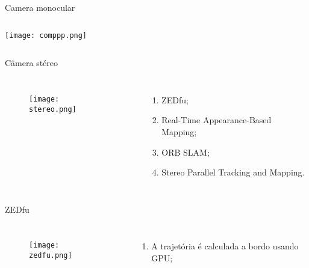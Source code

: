 \begin{frame}[t]{Camera monocular}
    \transboxout[duration=0.5]
    \begin{columns}
            \texttt{[image: comppp.png]}
    \end{columns}
\end{frame}
\begin{frame}[t]{Câmera stéreo}
    \transboxout[duration=0.5]
    \begin{columns}
            \begin{figure}
                \texttt{[image: stereo.png]}
                \caption{\cite{VisualOd23}}
            \end{figure}
            \begin{enumerate}
                \item ZEDfu;
                \item Real-Time Appearance-Based Mapping;
                \item ORB SLAM;
                \item Stereo Parallel Tracking and Mapping.
            \end{enumerate}
    \end{columns}
\end{frame}
\begin{frame}[c]{ZEDfu}
    \transboxout[duration=0.5]
    \begin{columns}
            \begin{figure}
            \texttt{[image: zedfu.png]}
            \caption{\cite{ZEDfuRea64}}
            \end{figure}
            \begin{enumerate}
                \item A trajetória é calculada a bordo usando GPU;
            \end{enumerate}
    \end{columns}

\end{frame}


